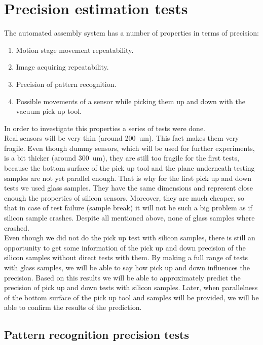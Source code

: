 \chapter{Precision estimation tests}
The automated assembly system has a number of properties in terms of precision:
\begin{enumerate}
\setlength\itemsep{-0.5em}
\item Motion stage movement repeatability.
\item Image acquiring repeatability.
\item Precision of pattern recognition.
\item Possible movements of a sensor while picking them up and down with the vacuum pick up tool.
\end{enumerate}

In order to investigate this properties a series of tests were done.
\\Real sensors will be very thin (around 200~um). This fact makes them very fragile. Even though dummy sensors, which will be used for further experiments, is a bit thicker (around 300~um), they are still too fragile for the first tests, because the bottom surface of the pick up tool and the plane underneath testing samples are not yet parallel enough. That is why for the first pick up and down tests we used glass samples. They have the same dimensions and represent close enough the properties of silicon sensors. Moreover, they are much cheaper, so that in case of test failure (sample break) it will not be such a big problem as if silicon sample crashes. Despite all mentioned above, none of glass samples where crashed.
\\Even though we did not do the pick up test with silicon samples, there is still an opportunity to get some information of the pick up and down precision of the silicon samples without direct tests with them. By making a full range of tests with glass samples, we will be able to say how pick up and down influences the precision. Based on this results we will be able to approximately predict the precision of pick up and down tests with silicon samples. Later, when parallelness of the bottom surface of the pick up tool and samples will be provided, we will be able to confirm the results of the prediction.

\section{Pattern recognition precision tests}


